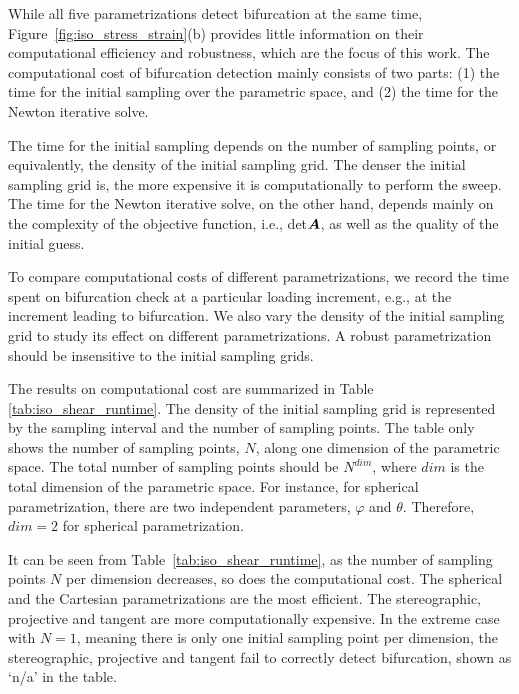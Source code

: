\documentclass[12pt]{article}
\numberwithin{equation}{section}
\begin{document}
While all five parametrizations detect bifurcation at the same time, 
Figure~\ref{fig:iso_stress_strain}(b) provides little information on 
their computational efficiency and robustness, which are the focus of 
this work. The computational cost of bifurcation detection mainly 
consists of two parts: (1) the time for the initial sampling over the 
parametric space, and (2) the time for the Newton iterative solve. 

The time for the initial sampling depends on the number of sampling 
points, or equivalently, the density of the initial sampling grid. The 
denser the initial sampling grid is, the more expensive it is 
computationally to perform the sweep. The time for the Newton 
iterative solve, on the other hand, depends mainly on the complexity 
of the objective function, i.e., det${\boldsymbol{A}}$, as well as the quality of 
the initial guess.

To compare computational costs of different parametrizations, we 
record the time spent on bifurcation check at a particular loading 
increment, e.g., at the increment leading to bifurcation. We also vary 
the density of the initial sampling grid to study its effect on 
different parametrizations. A robust parametrization should be 
insensitive to the initial sampling grids.

The results on computational cost are summarized in Table~
\ref{tab:iso_shear_runtime}. The density of the initial sampling grid 
is represented by the sampling interval and the number of sampling 
points. The table only shows the number of sampling points, $N$, along 
one dimension of the parametric space. The total number of sampling 
points should be $N^{dim}$, where $dim$ is the total dimension of 
the parametric space. For instance, for spherical parametrization, 
there are two independent parameters, $\varphi$ and $\theta$. 
Therefore, $dim=2$ for spherical parametrization.

It can be seen from Table~\ref{tab:iso_shear_runtime}, as the number 
of sampling points $N$ per dimension decreases, so does the 
computational cost. The spherical and the Cartesian parametrizations 
are the most efficient. The stereographic, projective and tangent are 
more computationally expensive. In the extreme case with $N=1$, 
meaning there is only one initial sampling point per dimension, the 
stereographic, projective and tangent fail to correctly detect 
bifurcation, shown as `n/a' in the table. 
\end{document}
